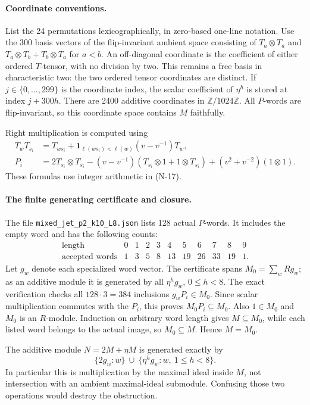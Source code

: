 \paragraph{Coordinate conventions.}
List the 24 permutations lexicographically, in zero-based one-line
notation.  Use the 300 basis vectors of the flip-invariant ambient
space consisting of $T_a\otimes T_a$ and
$T_a\otimes T_b+T_b\otimes T_a$ for $a<b$.
An off-diagonal coordinate is the coefficient of either ordered
$T$-tensor, with no division by two.  This remains a free basis in
characteristic two: the two ordered tensor coordinates are distinct.
If $j\in\{0,\ldots,299\}$ is the coordinate index, the scalar
coefficient of $\eta^h$ is stored at index $j+300h$.
There are 2400 additive coordinates in $\mathbb Z/1024\mathbb Z$.
All $P$-words are flip-invariant, so this coordinate space contains
$M$ faithfully.

Right multiplication is computed using
\[
 \begin{split}
 T_wT_{s_i}&=T_{ws_i}+
     \mathbf1_{\ell(ws_i)<\ell(w)}(v-v^{-1})T_w,\\
 P_i&=2T_{s_i}\otimes T_{s_i}
 -(v-v^{-1})(T_{s_i}\otimes1+1\otimes T_{s_i})
 +(v^2+v^{-2})(1\otimes1).
 \end{split}
 \tag{N-21}
\]
These formulas use integer arithmetic in (N-17).

\paragraph{The finite generating certificate and closure.}
The file \nolinkurl{mixed_jet_p2_k10_L8.json} lists 128 actual
$P$-words.  It includes the empty word and has the following counts:
\[
\begin{array}{c|rrrrrrrrrr}
\text{length}&0&1&2&3&4&5&6&7&8&9\\\hline
\text{accepted words}&1&3&5&8&13&19&26&33&19&1.
\end{array}
\]
Let $g_w$ denote each specialized word vector.  The certificate spans
$M_0=\sum_w Rg_w$; as an additive module it is generated by all
$\eta^h g_w$, $0\le h<8$.
The exact verification checks all $128\cdot3=384$ inclusions
$g_wP_i\in M_0$.  Since scalar multiplication commutes with the
$P_i$, this proves $M_0P_i\subseteq M_0$.  Also $1\in M_0$ and
$M_0$ is an $R$-module.  Induction on arbitrary word length gives
$M\subseteq M_0$, while each listed word belongs to the actual image,
so $M_0\subseteq M$.  Hence $M=M_0$.

The additive module $N=2M+\eta M$ is generated exactly by
\[
 \{2g_w:w\}\ \cup\
 \{\eta^h g_w:w,\ 1\le h<8\}.
 \tag{N-22}
\]
In particular this is multiplication by the maximal ideal inside
$M$, not intersection with an ambient maximal-ideal submodule.
Confusing those two operations would destroy the obstruction.

